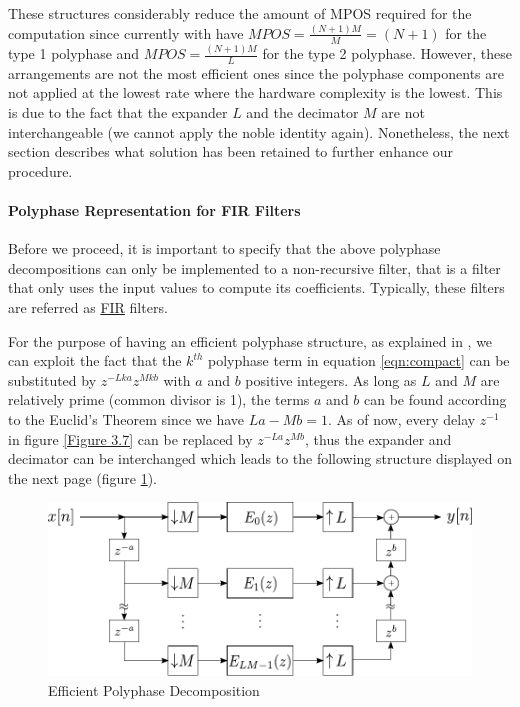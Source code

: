 These structures considerably reduce the amount of MPOS required for the computation since currently with have $MPOS = \frac{(N+1)M}{M} = (N+1)$ for the type 1 polyphase and $MPOS = \frac{(N+1)M}{L} $ for the type 2 polyphase. However, these arrangements are not the most efficient ones since the polyphase components are not applied at the lowest rate where the hardware complexity is the lowest. This is due to the fact that the expander $L$ and the decimator $M$ are not interchangeable (we cannot apply the noble identity again). Nonetheless, the next section describes what solution has been retained to further enhance our procedure.

\newpage

\paragraph{Polyphase Representation for FIR Filters}
\justify

Before we proceed, it is important to specify that the above polyphase decompositions can only be implemented to a non-recursive filter, that is a filter that only uses the input values to compute its coefficients. Typically, these filters are referred as \hyperlink{FIR}{FIR} filters. 

For the purpose of having an efficient polyphase structure, as explained in \cite{vaidyanathan}, we can exploit the fact that the  $k^{th}$ polyphase term in equation \ref{eqn:compact} can be substituted by $z^{-Lka}z^{Mkb}$ with $a$ and $b$ positive integers. As long as $L$ and $M$ are relatively prime (common divisor is 1), the terms $a$ and $b$ can be found according to the Euclid's Theorem since we have $La-Mb=1$. As of now, every delay $z^{-1}$ in figure \ref{Figure 3.7} can be replaced by $z^{-La}z^{Mb}$, thus the expander and decimator can be interchanged which leads to the following structure displayed on the next page (figure \ref{Figure 3.8}).

\begin{figure}[ht!]
	\centering
	\includegraphics[scale=0.95]{polyphase_direct_efficient.pdf}
	\vspace*{1mm}
	\caption{Efficient Polyphase Decomposition}
	\label{Figure 3.8}
\end{figure}



